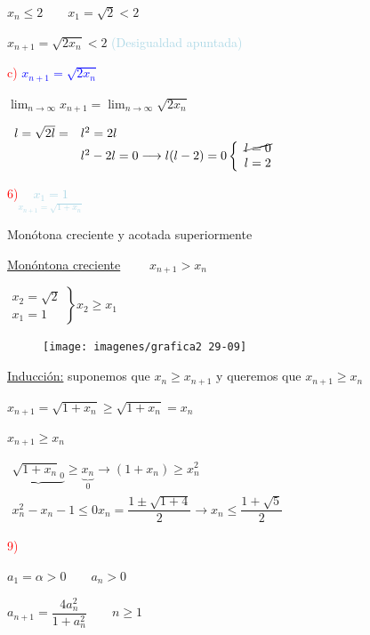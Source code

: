 \documentclass[12pt]{article}
\renewcommand{\arraystretch}{1.5}
\begin{document}
$x_n\le2\qquad x_1=\sqrt{2}<2$

$x_{n+1}=\sqrt{2x_n}<2$ \textcolor{lightblue}{(Desigualdad apuntada)}

\textcolor{red}{c)} \textcolor{blue}{$x_{n+1}=\sqrt{2x_n}$}

$\lim_{n\to\infty}x_{n+1}=\lim_{n\to\infty}\sqrt{2x_n}$

{\renewcommand{\arraystretch}{0.8}$\begin{array}{ll}
	l=\sqrt{2l}= & l^2=2l\\
	 & l^2-2l=0\longrightarrow l(l-2)=0\left\{\begin{array}{l}
		\cancel{l=0}\\
		l=2
	\end{array}\right.
\end{array}$}

\textcolor{red}{6)}\textcolor{lightblue}{$\underset{\displaystyle x_{n+1}=\sqrt{1+x_n}}{x_1=1}$}

Monótona creciente y acotada superiormente

\underline{Monóntona creciente} $\qquad x_{n+1}>x_n$

$\left.\begin{array}{l}
	x_2=\sqrt{2}\\
	x_1=1
\end{array}\right\}x_2\ge x_1$

\begin{figure}
	\texttt{[image: imagenes/grafica2 29-09]}
\end{figure}

\underline{Inducción:} suponemos que $x_n\ge x_{n+1}$ y queremos que $x_{n+1}\ge x_n$

$x_{n+1}=\sqrt{1+x_n}\ge \sqrt{1+x_n}=x_n$


$x_{n+1}\ge x_n$

$\begin{array}{r}
		\underbrace{\sqrt{1+x_n}_{0}}\ge \underbrace{x_n}_{0}\longrightarrow(1+x_n)\ge x_n^2\\
		x_n^2-x_n-1\le0
	x_{n}=\dfrac{1\pm\sqrt{1+4}}{2}\longrightarrow x_n\le \dfrac{1+\sqrt{5}}{2}
\end{array}$\qquad



\textcolor{red}{9)}

$a_1=\alpha>0\qquad a_n>0$

$a_{n+1}=\dfrac{4a_n^2}{1+a_n^2}\qquad n\ge 1$
\end{document}
